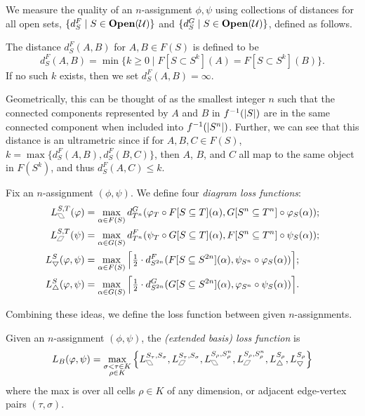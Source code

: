 We measure the quality of an  $n$-assignment $\phi, \psi$ using  collections of distances for all open sets, $\{d_S^F \mid S \in \mathbf{Open}(\mathcal{U})\}$ and $\{d_S^G \mid S \in \mathbf{Open}(\mathcal{U})\}$, defined as follows.  
\begin{definition}
The distance $d_S^{F}(A,B)$ for $A,B \in F(S)$ is defined to be 
\begin{equation}
\label{eqn:DistanceDefinition}
    d_S^{F}(A,B) = 
    \min\{ k\geq0 \mid F[S \subset S^k](A) = F[S \subset S^k](B)\}.
\end{equation}
If no such $k$ exists, then we  set $d_S^{F}(A,B) = \infty$.
\end{definition}
Geometrically, this can be thought of as the smallest integer $n$ such that the connected components represented by $A$ and $B$ in $f^{-1}(|S|)$ are in the same connected component when included into $f^{-1}(|S^n|)$. 
Further, we can see that this distance is an ultrametric since if for ${A,B,C \in F(S)}$, $k = \max\{d_S^{F}(A,B), d_S^{F}(B,C)\}$, then $A$, $B$, and $C$ all map to the same object in $F(S^k)$, and thus $d_S^F(A,C) \leq k$. 
\begin{definition}
\label{df:Loss_by_diagram}
Fix an $n$-assignment
$(\phi,\psi)$. 
We define four \emph{diagram loss functions}: 
\begin{align*}
\Lpl^{S,T}(\phi)
    &= \max\limits_{\alpha \in F(S)} 
       d_{T^n}^{G}(
        \varphi_T \circ F[S \subseteq T](\alpha),
        G[S^n \subseteq T^n] \circ \varphi_S(\alpha)
        );\\
\Lpr^{S,T} (\psi)
    &= \max\limits_{\alpha \in G(S)} 
       d_{T^n}^{F}(
        \psi_T \circ G[S \subseteq T](\alpha), 
        F[S^n \subseteq T^n] \circ \psi_S(\alpha)
    );\\
\Ltd^S (\phi,\psi)
    &= \max\limits_{\alpha \in F(S)}  \Big \lceil \tfrac{1}{2} \cdot d_{S^{2n}}^{F}(
    F[S \subseteq S^{2n}] (\alpha),
    \psi_{S^n} \circ \varphi_S(\alpha)
    ) \Big \rceil;\\
\Ltu^S (\phi,\psi)
    &= \max\limits_{\alpha \in G(S)}\Big \lceil \tfrac{1}{2} \cdot d_{S^{2n}}^{G}(
    G[S \subseteq S^{2n}](\alpha),
    \varphi_{S^n} \circ \psi_S(\alpha)
    )\Big \rceil.
\end{align*}
\end{definition}
Combining these ideas, we define the loss function between given $n$-assignments.

\begin{definition}
\label{shortdef}
Given an $n$-assignment $(\phi,\psi)$, the \emph{(extended basis) loss function} is 
\begin{equation}
\label{eq:loss}
L_B(\phi,\psi) = \max_{ \substack{\sigma < \tau \in K \\ \rho \in K}}
\left\{
\Lpl^{S_\tau, S_\sigma}, \Lpr^{S_\tau, S_\sigma},
\Lpl^{S_\rho, S_\rho^n}, \Lpr^{S_\rho, S_\rho^n},
\Ltu^{S_\rho}, \Ltd^{S_\rho}
\right\}
\end{equation}
where the max is over all cells $\rho \in K$ of any dimension, or adjacent edge-vertex pairs $(\tau, \sigma)$. 
\end{definition}

